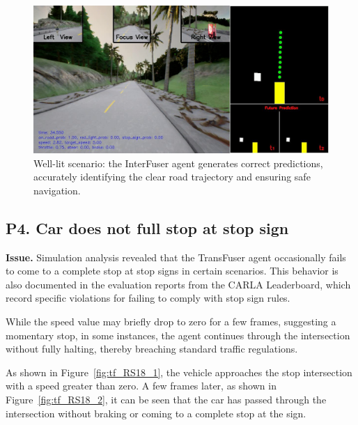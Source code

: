\begin{figure}[htbp]
    \centering
    \includegraphics[width=\linewidth]{images/RS01_light.png}
    \caption{Well-lit scenario: the InterFuser agent generates correct predictions, accurately identifying the clear road trajectory and ensuring safe navigation.}
    \label{fig:light_RS01}
\end{figure}

\subsection{P4. Car does not full stop at stop sign}
\noindent\textbf{Issue.} Simulation analysis revealed that the TransFuser agent occasionally fails to come to a complete stop at stop signs in certain scenarios. This behavior is also documented in the evaluation reports from the CARLA Leaderboard, which record specific violations for failing to comply with stop sign rules.

While the speed value may briefly drop to zero for a few frames, suggesting a momentary stop, in some instances, the agent continues through the intersection without fully halting, thereby breaching standard traffic regulations.

As shown in Figure~\ref{fig:tf_RS18_1}, the vehicle approaches the stop intersection with a speed greater than zero. A few frames later, as shown in Figure~\ref{fig:tf_RS18_2}, it can be seen that the car has passed through the intersection without braking or coming to a complete stop at the sign.

